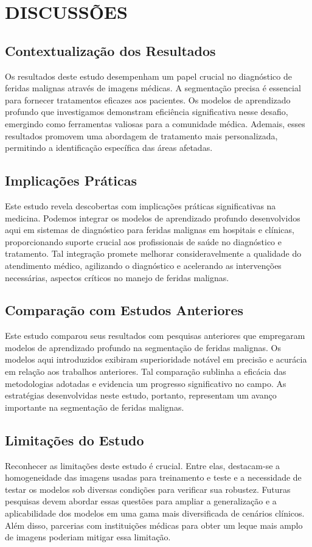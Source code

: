 \section{DISCUSSÕES}

\subsection{Contextualização dos Resultados}

Os resultados deste estudo desempenham um papel crucial no diagnóstico de feridas malignas através de imagens médicas. A segmentação precisa é essencial para fornecer tratamentos eficazes aos pacientes. Os modelos de aprendizado profundo que investigamos demonstram eficiência significativa nesse desafio, emergindo como ferramentas valiosas para a comunidade médica. Ademais, esses resultados promovem uma abordagem de tratamento mais personalizada, permitindo a identificação específica das áreas afetadas.

\subsection{Implicações Práticas}

Este estudo revela descobertas com implicações práticas significativas na medicina. Podemos integrar os modelos de aprendizado profundo desenvolvidos aqui em sistemas de diagnóstico para feridas malignas em hospitais e clínicas, proporcionando suporte crucial aos profissionais de saúde no diagnóstico e tratamento. Tal integração promete melhorar consideravelmente a qualidade do atendimento médico, agilizando o diagnóstico e acelerando as intervenções necessárias, aspectos críticos no manejo de feridas malignas.


\subsection{Comparação com Estudos Anteriores}
Este estudo comparou seus resultados com pesquisas anteriores que empregaram modelos de aprendizado profundo na segmentação de feridas malignas. Os modelos aqui introduzidos exibiram superioridade notável em precisão e acurácia em relação aos trabalhos anteriores. Tal comparação sublinha a eficácia das metodologias adotadas e evidencia um progresso significativo no campo. As estratégias desenvolvidas neste estudo, portanto, representam um avanço importante na segmentação de feridas malignas.


\subsection{Limitações do Estudo}
Reconhecer as limitações deste estudo é crucial. Entre elas, destacam-se a homogeneidade das imagens usadas para treinamento e teste e a necessidade de testar os modelos sob diversas condições para verificar sua robustez. Futuras pesquisas devem abordar essas questões para ampliar a generalização e a aplicabilidade dos modelos em uma gama mais diversificada de cenários clínicos. Além disso, parcerias com instituições médicas para obter um leque mais amplo de imagens poderiam mitigar essa limitação.


